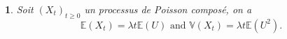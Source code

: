 \documentclass[8pt,notheorems]{beamer}
\newtheorem{prop}{\translate{Proposition}}
\theoremstyle{definition}
\theoremstyle{example}
\newtheorem{example}{\translate{Exemple}}
\theoremstyle{mystyle}
\theoremstyle{plain}
\begin{document}
\begin{frame}[allowframebreaks]
\begin{prop}
Soit $(X_t)_{t\geq0}$ un processus de Poisson composé, on a
$$\mathbb{E}(X_t)=\lambda t \mathbb{E}(U)\text{ and }\mathbb{V}(X_t)=\lambda t\mathbb{E}\left(U^{2}\right).$$
\end{prop}
\end{frame}
\end{document}
